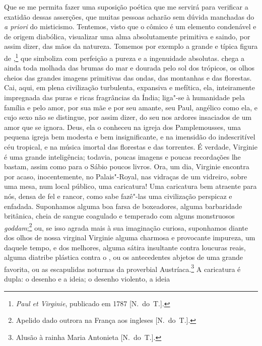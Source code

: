 Que se me permita fazer uma suposição poética que me servirá para
verificar a exatidão dessas asserções, que muitas pessoas acharão sem
dúvida manchadas do \textit{a priori} do misticismo. Tentemos, visto
que o cômico é um elemento condenável e de origem diabólica, visualizar
uma alma absolutamente primitiva e saindo, por assim dizer, das mãos da
natureza. Tomemos por exemplo a grande e típica figura de
,\footnote{ \textit{ Paul et Virginie},\textit{ }publicado em
1787 [N.~do~T.].} que simboliza com perfeição a pureza e a ingenuidade
absolutas.  chega a  ainda toda molhada das brumas do mar
e dourada pelo sol dos trópicos, os olhos cheios das grandes imagens
primitivas das ondas, das montanhas e das florestas. Cai, aqui, em
plena civilização turbulenta, expansiva e mefítica, ela, inteiramente
impregnada das puras e ricas fragrâncias da Índia; liga"-se à humanidade	
pela família e pelo amor, por sua mãe e por seu amante, seu Paul,
angélico como ela, e cujo sexo não se distingue, por assim dizer, do
seu nos ardores insaciados de um amor que se ignora. Deus, ela o
conheceu na igreja dos Pamplemousses, uma pequena igreja bem modesta e
bem insignificante, e na imensidão do indescritível céu tropical, e na
música imortal das florestas e das torrentes. É verdade, Virginie é uma
grande inteligência; todavia, poucas imagens e poucas recordações lhe
bastam, assim como para o Sábio poucos livros. Ora, um dia, Virginie
encontra por acaso, inocentemente, no Palais"-Royal, nas vidraças de um	
vidreiro, sobre uma mesa, num local público, uma caricatura! Uma
caricatura bem atraente para nós, densa de fel e rancor, como sabe
fazê"-las uma civilização perspicaz e enfadada. Suponhamos alguma boa
farsa de boxeadores, alguma barbaridade britânica, cheia de sangue
coagulado e temperado com alguns monstruosos
\textit{goddam};\footnote{ Apelido dado outrora na França aos ingleses	
[N.~do~T.].} ou, se isso agrada mais à sua imaginação curiosa,
suponhamos diante dos olhos de nossa virginal Virginie alguma charmosa
e provocante impureza, um  daquele tempo, e dos melhores, alguma
sátira insultante contra loucuras reais, alguma diatribe plástica
contra o , ou os antecedentes abjetos de uma grande
favorita, ou as escapulidas noturnas da proverbial
Austríaca.\footnote{ Alusão à rainha Maria Antonieta [N.~do~T.].} A	
caricatura é dupla: o desenho e a ideia; o desenho violento, a ideia
